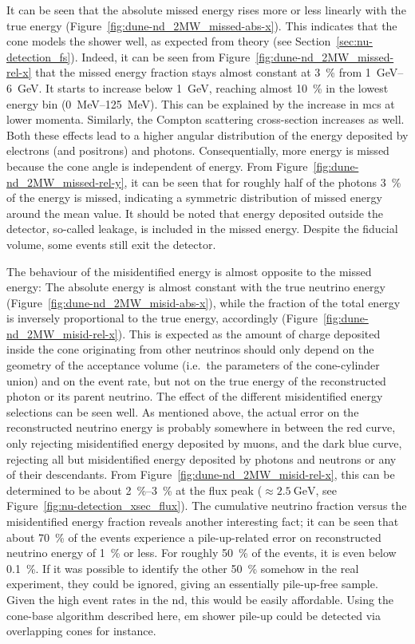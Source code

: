 It can be seen that the absolute missed energy rises more or less linearly with the true energy (Figure~\ref{fig:dune-nd_2MW_missed-abs-x}).
This indicates that the cone models the shower well, as expected from theory (see Section~\ref{sec:nu-detection_fs}).
Indeed, it can be seen from Figure~\ref{fig:dune-nd_2MW_missed-rel-x} that the missed energy fraction stays almost constant at \SI{3}{\percent} from \SIrange{1}{6}{\giga\electronvolt}.
It starts to increase below \SI{1}{\giga\electronvolt}, reaching almost \SI{10}{\percent} in the lowest energy bin (\SIrange{0}{125}{\mega\electronvolt}).
This can be explained by the increase in \gls{mcs} at lower momenta.
Similarly, the Compton scattering cross-section increases as well.
Both these effects lead to a higher angular distribution of the energy deposited by electrons (and positrons) and photons.
Consequentially, more energy is missed because the cone angle is independent of energy.
From Figure~\ref{fig:dune-nd_2MW_missed-rel-y}, it can be seen that for roughly half of the photons \SI{3}{\percent} of the energy is missed, indicating a symmetric distribution of missed energy around the mean value.
It should be noted that energy deposited outside the detector, so-called leakage, is included in the missed energy.
Despite the fiducial volume, some events still exit the detector.

The behaviour of the misidentified energy is almost opposite to the missed energy: The absolute energy is almost constant with the true neutrino energy (Figure~\ref{fig:dune-nd_2MW_misid-abs-x}), while the fraction of the total energy is inversely proportional to the true energy, accordingly (Figure~\ref{fig:dune-nd_2MW_misid-rel-x}).
This is expected as the amount of charge deposited inside the cone originating from other neutrinos should only depend on the geometry of the acceptance volume (i.e.\ the parameters of the cone-cylinder union) and on the event rate, but not on the true energy of the reconstructed photon or its parent neutrino.
The effect of the different misidentified energy selections can be seen well.
As mentioned above, the actual error on the reconstructed neutrino energy is probably somewhere in between the red curve, only rejecting misidentified energy deposited by muons, and the dark blue curve, rejecting all but misidentified energy deposited by photons and neutrons or any of their descendants.
From Figure~\ref{fig:dune-nd_2MW_misid-rel-x}, this can be determined to be about \SIrange{2}{3}{\percent} at the flux peak ($\approx \SI{2.5}{\giga\electronvolt}$, see Figure~\ref{fig:nu-detection_xsec_flux}).
The cumulative neutrino fraction versus the misidentified energy fraction reveals another interesting fact; it can be seen that about \SI{70}{\percent} of the events experience a pile-up-related error on reconstructed neutrino energy of \SI{1}{\percent} or less.
For roughly \SI{50}{\percent} of the events, it is even below \SI{0.1}{\percent}.
If it was possible to identify the other \SI{50}{\percent} somehow in the real experiment, they could be ignored, giving an essentially pile-up-free sample.
Given the high event rates in the \gls{nd}, this would be easily affordable.
Using the cone-base algorithm described here, \gls{em} shower pile-up could be detected via overlapping cones for instance.

